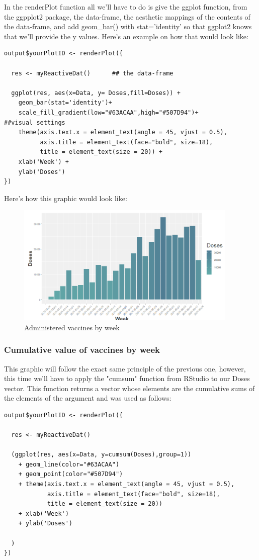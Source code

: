 In the renderPlot function all we'll have to do is give the ggplot function, from the ggpplot2 package, the data-frame, the aesthetic mappings of the contents of the data-frame, and add geom\_bar() with stat='identity' so that ggplot2 knows that we'll provide the y values. Here's an example on how that would look like:

\begin{verbatim}
output$yourPlotID <- renderPlot({

  res <- myReactiveDat()      ## the data-frame

  ggplot(res, aes(x=Data, y= Doses,fill=Doses)) +  
    geom_bar(stat='identity')+ 
    scale_fill_gradient(low="#63ACAA",high="#507D94")+          ##visual settings
    theme(axis.text.x = element_text(angle = 45, vjust = 0.5), 
          axis.title = element_text(face="bold", size=18),
          title = element_text(size = 20)) + 
    xlab('Week') +
    ylab('Doses')
})
\end{verbatim}

Here's how this graphic would look like:

\begin{figure}[H]
\centering
\includegraphics[width=300pt,trim=10 0 0 -10mm]{images/grafico1novo.png}
\caption{Administered vaccines by week}
\label{fig:diagrama}
\end{figure}

\subsubsection{Cumulative value of vaccines by week}

This graphic will follow the exact same principle of the previous one, however, this time we'll have to apply the "cumsum" function from RStudio to our Doses vector. This function returns a vector whose elements are the cumulative sums of the elements of the argument and was used as follows:

\begin{verbatim}
output$yourPlotID <- renderPlot({
  
  res <- myReactiveDat()
  
  (ggplot(res, aes(x=Data, y=cumsum(Doses),group=1))
    + geom_line(color="#63ACAA")
    + geom_point(color="#507D94") 
    + theme(axis.text.x = element_text(angle = 45, vjust = 0.5),
            axis.title = element_text(face="bold", size=18),
            title = element_text(size = 20))  
    + xlab('Week') 
    + ylab('Doses')
    
  )
})
\end{verbatim}

